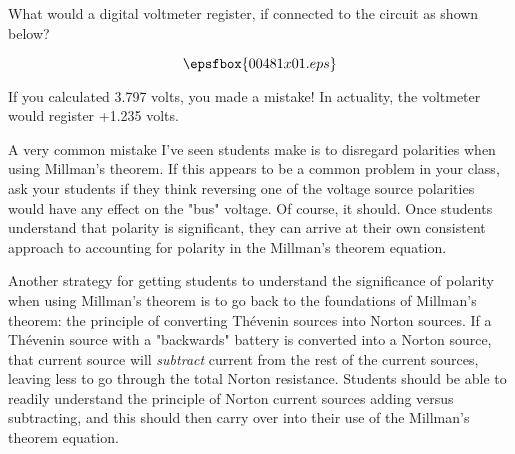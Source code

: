 

What would a digital voltmeter register, if connected to the circuit as shown below?

$$\epsfbox{00481x01.eps}$$







If you calculated 3.797 volts, you made a mistake!  In actuality, the voltmeter would register +1.235 volts.







A very common mistake I've seen students make is to disregard polarities when using Millman's theorem.  If this appears to be a common problem in your class, ask your students if they think reversing one of the voltage source polarities would have any effect on the "bus" voltage.  Of course, it should.  Once students understand that polarity is significant, they can arrive at their own consistent approach to accounting for polarity in the Millman's theorem equation.

Another strategy for getting students to understand the significance of polarity when using Millman's theorem is to go back to the foundations of Millman's theorem: the principle of converting Th\'evenin sources into Norton sources.  If a Th\'evenin source with a "backwards" battery is converted into a Norton source, that current source will {\it subtract} current from the rest of the current sources, leaving less to go through the total Norton resistance.  Students should be able to readily understand the principle of Norton current sources adding versus subtracting, and this should then carry over into their use of the Millman's theorem equation.




